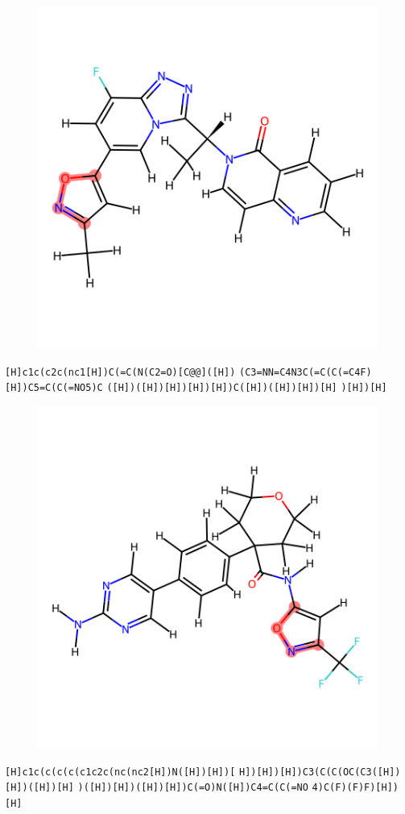 \documentclass{article}
\begin{document}
\begin{figure}[ht]
\centering
    \includegraphics{mol94.png}
\end{figure}
\verb|[H]c1c(c2c(nc1[H])C(=C(N(C2=O)[C@@]([H])| \verb|(C3=NN=C4N3C(=C(C(=C4F)[H])C5=C(C(=NO5)C| \verb|([H])([H])[H])[H])[H])C([H])([H])[H])[H]| \verb|)[H])[H]|

\begin{figure}[ht]
\centering
    \includegraphics{mol95.png}
\end{figure}
\verb|[H]c1c(c(c(c(c1c2c(nc(nc2[H])N([H])[H])[| \verb|H])[H])[H])C3(C(C(OC(C3([H])[H])([H])[H]| \verb|)([H])[H])([H])[H])C(=O)N([H])C4=C(C(=NO| \verb|4)C(F)(F)F)[H])[H]|
\end{document}
